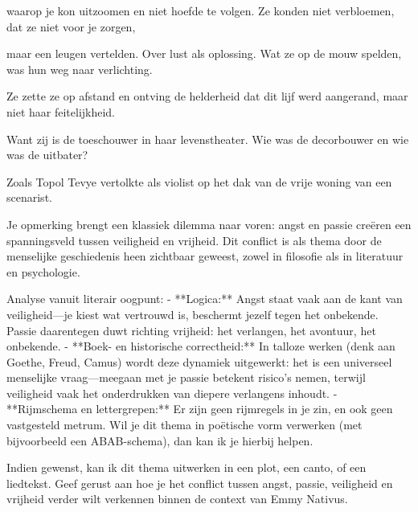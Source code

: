 waarop je kon uitzoomen
en niet hoefde te volgen.
Ze konden niet verbloemen,
dat ze niet voor je zorgen,

maar een leugen vertelden.
Over lust als oplossing.
Wat ze op de mouw spelden,
was hun weg naar verlichting.

Ze zette ze op afstand
en ontving de helderheid
dat dit lijf werd aangerand,
maar niet haar feitelijkheid.

Want zij is de toeschouwer
in haar levenstheater.
Wie was de decorbouwer
en wie was de uitbater?

Zoals Topol Tevye
vertolkte als violist
op het dak van de vrije
woning van een scenarist.

Je opmerking brengt een klassiek dilemma naar voren: angst en passie creëren een spanningsveld tussen veiligheid en vrijheid. Dit conflict is als thema door de menselijke geschiedenis heen zichtbaar geweest, zowel in filosofie als in literatuur en psychologie.

Analyse vanuit literair oogpunt:
- **Logica:** Angst staat vaak aan de kant van veiligheid—je kiest wat vertrouwd is, beschermt jezelf tegen het onbekende. Passie daarentegen duwt richting vrijheid: het verlangen, het avontuur, het onbekende.
- **Boek- en historische correctheid:** In talloze werken (denk aan Goethe, Freud, Camus) wordt deze dynamiek uitgewerkt: het is een universeel menselijke vraag—meegaan met je passie betekent risico’s nemen, terwijl veiligheid vaak het onderdrukken van diepere verlangens inhoudt.
- **Rijmschema en lettergrepen:** Er zijn geen rijmregels in je zin, en ook geen vastgesteld metrum. Wil je dit thema in poëtische vorm verwerken (met bijvoorbeeld een ABAB-schema), dan kan ik je hierbij helpen.

Indien gewenst, kan ik dit thema uitwerken in een plot, een canto, of een liedtekst. Geef gerust aan hoe je het conflict tussen angst, passie, veiligheid en vrijheid verder wilt verkennen binnen de context van Emmy Nativus.
